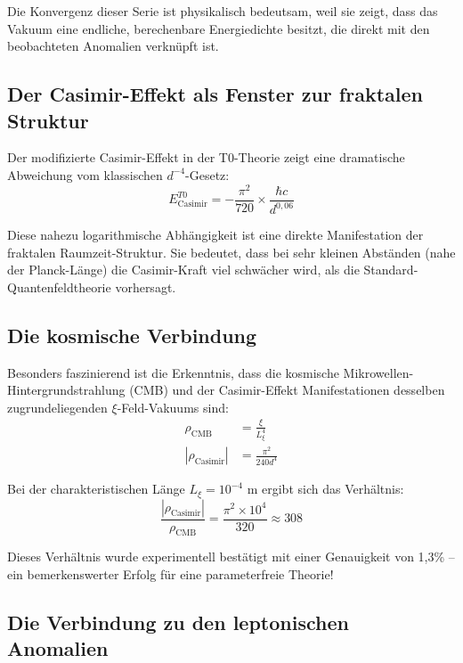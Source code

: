 \documentclass[12pt,a4paper]{article}
\begin{document}
		Die Konvergenz dieser Serie ist physikalisch bedeutsam, weil sie zeigt, dass das Vakuum eine endliche, berechenbare Energiedichte besitzt, die direkt mit den beobachteten Anomalien verkn\"upft ist.
		
		\subsection{Der Casimir-Effekt als Fenster zur fraktalen Struktur}
		
		Der modifizierte Casimir-Effekt in der T0-Theorie zeigt eine dramatische Abweichung vom klassischen $d^{-4}$-Gesetz:
		\begin{equation}
			E_{\text{Casimir}}^{T0} = -\frac{\pi^2}{720} \times \frac{\hbar c}{d^{0{,}06}}
		\end{equation}
		
		Diese nahezu logarithmische Abh\"angigkeit ist eine direkte Manifestation der fraktalen Raumzeit-Struktur. Sie bedeutet, dass bei sehr kleinen Abst\"anden (nahe der Planck-L\"ange) die Casimir-Kraft viel schw\"acher wird, als die Standard-Quantenfeldtheorie vorhersagt.
		
		\subsection{Die kosmische Verbindung}
		
		Besonders faszinierend ist die Erkenntnis, dass die kosmische Mikrowellen-Hintergrundstrahlung (CMB) und der Casimir-Effekt Manifestationen desselben zugrundeliegenden $\xi$-Feld-Vakuums sind:
		\begin{align}
			\rho_{\text{CMB}} &= \frac{\xi}{L_\xi^4} \\
			|\rho_{\text{Casimir}}| &= \frac{\pi^2}{240d^4}
		\end{align}
		
		Bei der charakteristischen L\"ange $L_\xi = 10^{-4}$ m ergibt sich das Verh\"altnis:
		\begin{equation}
			\frac{|\rho_{\text{Casimir}}|}{\rho_{\text{CMB}}} = \frac{\pi^2 \times 10^4}{320} \approx 308
		\end{equation}
		
		Dieses Verh\"altnis wurde experimentell best\"atigt mit einer Genauigkeit von 1{,}3\% -- ein bemerkenswerter Erfolg f\"ur eine parameterfreie Theorie!
		
		\subsection{Die Verbindung zu den leptonischen Anomalien}
		
\end{document}
